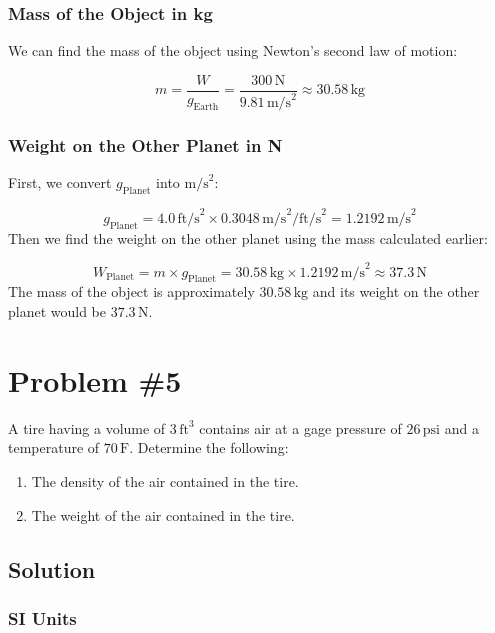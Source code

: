 \documentclass{article}
\begin{document}
\subsubsection*{Mass of the Object in kg}

We can find the mass of the object using Newton's second law of motion:

\[
m = \frac{W}{g_{\text{Earth}}} = \frac{300 \, \text{N}}{9.81 \, \text{m/s}^2} \approx 30.58 \, \text{kg}
\]

\subsubsection*{Weight on the Other Planet in N}

First, we convert \( g_{\text{Planet}} \) into \( \text{m/s}^2 \):

\[
g_{\text{Planet}} = 4.0 \, \text{ft/s}^2 \times 0.3048 \, \text{m/s}^2/\text{ft/s}^2 = 1.2192 \, \text{m/s}^2
\]
Then we find the weight on the other planet using the mass calculated earlier:

\[
W_{\text{Planet}} = m \times g_{\text{Planet}} = 30.58 \, \text{kg} \times 1.2192 \, \text{m/s}^2 \approx 37.3 \, \text{N}
\]
The mass of the object is approximately \( 30.58 \, \text{kg} \) and its weight on the other planet would be \( 37.3 \, \text{N} \).

\newpage
\section*{Problem \#5}
A tire having a volume of \(3 \, \text{ft}^3\) contains air at a gage pressure of \(26 \, \text{psi}\) and a temperature of \(70 \, \text{F}\). Determine the following:

\begin{enumerate}
    \item The density of the air contained in the tire.
    \item The weight of the air contained in the tire.
\end{enumerate}

\subsection*{Solution}
\subsubsection*{SI Units}
\end{document}

